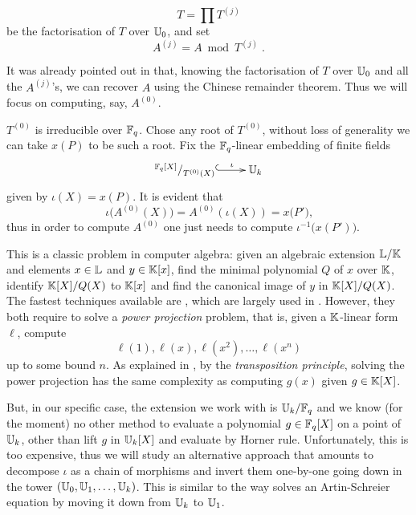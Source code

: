 \begin{equation}
  \label{eq:T}
  T = \prod T^{(j)}
\end{equation}
be the factorisation of $T$ over $\mathbb{U}_0$, and set
\begin{equation}
  \label{eq:A}
  A^{(j)} = A \bmod T^{(j)}
  \;\text{.}
\end{equation}

It was already pointed out in \cite[$\S$2.3]{Cou96} that, knowing the
factorisation of $T$ over $\mathbb{U}_0$ and all the $A^{(j)}$'s, we can
recover $A$ using the Chinese remainder theorem. Thus we will focus on
computing, say, $A^{(0)}$.

$T^{(0)}$ is irreducible over $\mathbb{F}_q$. Chose any root of $T^{(0)}$,
without loss of generality we can take $x(P)$ to be such a root.  Fix
the $\mathbb{F}_q$-linear embedding of finite fields
\begin{equation}
  \label{eq:embed}
  \xymatrix{
    ^{\F_q[X]}/_{T^{(0)}(X)} \ar@{^{(}->}[r]^-\iota & \U_k
  }
\end{equation}
given by $\iota(X) = x(P)$. It is evident that
\begin{equation}
  \iota\bigl(A^{(0)}(X)\bigr) = A^{(0)}\left(\iota(X)\right)=x\bigl(P'\bigr)
  \text{,}
\end{equation}
thus in order to compute $A^{(0)}$ one just needs to compute
$\iota^{-1}\bigl(x(P')\bigr)$.

This is a classic problem in computer algebra: given an algebraic
extension $\mathbb{L}/\mathbb{K}$ and elements $x\in\mathbb{L}$ and $y\in\mathbb{K}[x]$, find the
minimal polynomial $Q$ of $x$ over $\mathbb{K}$, identify $\mathbb{K}[X]/Q(X)$ to
$\mathbb{K}[x]$ and find the canonical image of $y$ in $\mathbb{K}[X]/Q(X)$. The
fastest techniques available are \cite{Shoup99,PS06}, which are largely
used in \cite{DFS09}. However, they both require to solve a
\emph{power projection} problem, that is, given a $\mathbb{K}$-linear form
$\ell$, compute
\begin{equation}
  \ell(1), \ell(x), \ell(x^2), \dots, \ell(x^n)
\end{equation}
up to some bound $n$. As explained in \cite{Shoup99}, by the
\emph{transposition principle}, solving the power projection has the
same complexity as computing $g(x)$ given $g\in\mathbb{K}[X]$.

But, in our specific case, the extension we work with is $\mathbb{U}_k/\mathbb{F}_q$ and
we know (for the moment) no other method to evaluate a polynomial
$g\in\mathbb{F}_q[X]$ on a point of $\mathbb{U}_k$, other than lift $g$ in $\mathbb{U}_k[X]$
and evaluate by Horner rule. Unfortunately, this is too expensive,
thus we will study an alternative approach that amounts to decompose
$\iota$ as a chain of morphisms and invert them one-by-one going down
in the tower $(\mathbb{U}_0,\mathbb{U}_1,\ldots,\mathbb{U}_k)$. This is similar to the way
\cite{Cou00} solves an Artin-Schreier equation by moving it down from
$\mathbb{U}_k$ to $\mathbb{U}_1$.


